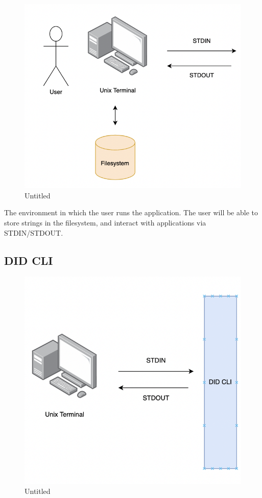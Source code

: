 \begin{figure}
\centering
\includegraphics{Architecture 1442df162dbe45f4a423ba37d3e12363/Untitled.png}
\caption{Untitled}
\end{figure}

The environment in which the user runs the application. The user will be
able to store strings in the filesystem, and interact with applications
via STDIN/STDOUT.

\hypertarget{did-cli}{%
\subsection{DID CLI}\label{did-cli}}

\begin{figure}
\centering
\includegraphics{Architecture 1442df162dbe45f4a423ba37d3e12363/Untitled 1.png}
\caption{Untitled}
\end{figure}

